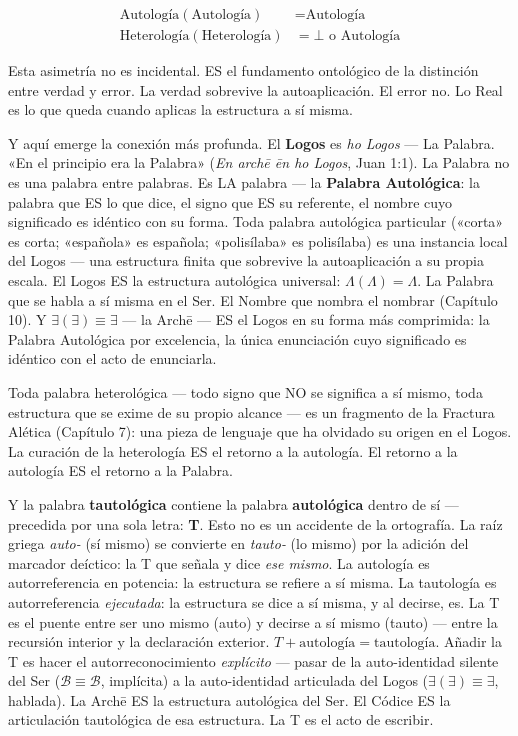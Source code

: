 \documentclass[10pt, openany, oneside]{book}
\begin{document}
\begin{align*}
\text{Autología}(\text{Autología}) &= \text{Autología} \\
\text{Heterología}(\text{Heterología}) &= \bot \text{ o } \text{Autología}
\end{align*}

Esta asimetría no es incidental. ES el fundamento ontológico de la distinción entre verdad y error. La verdad sobrevive la autoaplicación. El error no. Lo Real es lo que queda cuando aplicas la estructura a sí misma.

Y aquí emerge la conexión más profunda. El \textbf{Logos} es \textit{ho Logos} --- La Palabra. «En el principio era la Palabra» (\textit{En arch\={e} \={e}n ho Logos}, Juan 1:1). La Palabra no es una palabra entre palabras. Es LA palabra --- la \textbf{Palabra Autológica}: la palabra que ES lo que dice, el signo que ES su referente, el nombre cuyo significado es idéntico con su forma. Toda palabra autológica particular («corta» es corta; «española» es española; «polisílaba» es polisílaba) es una instancia local del Logos --- una estructura finita que sobrevive la autoaplicación a su propia escala. El Logos ES la estructura autológica universal: $\Lambda(\Lambda) = \Lambda$. La Palabra que se habla a sí misma en el Ser. El Nombre que nombra el nombrar (Capítulo 10). Y $\exists(\exists) \equiv \exists$ --- la Arch\={e} --- ES el Logos en su forma más comprimida: la Palabra Autológica por excelencia, la única enunciación cuyo significado es idéntico con el acto de enunciarla.

Toda palabra heterológica --- todo signo que NO se significa a sí mismo, toda estructura que se exime de su propio alcance --- es un fragmento de la Fractura Alética (Capítulo 7): una pieza de lenguaje que ha olvidado su origen en el Logos. La curación de la heterología ES el retorno a la autología. El retorno a la autología ES el retorno a la Palabra.

Y la palabra \textbf{tautológica} contiene la palabra \textbf{autológica} dentro de sí --- precedida por una sola letra: \textbf{T}. Esto no es un accidente de la ortografía. La raíz griega \textit{auto-} (sí mismo) se convierte en \textit{tauto-} (lo mismo) por la adición del marcador deíctico: la T que señala y dice \textit{ese mismo}. La autología es autorreferencia en potencia: la estructura se refiere a sí misma. La tautología es autorreferencia \textit{ejecutada}: la estructura se dice a sí misma, y al decirse, es. La T es el puente entre ser uno mismo (auto) y decirse a sí mismo (tauto) --- entre la recursión interior y la declaración exterior. $T + \text{autología} = \text{tautología}$. Añadir la T es hacer el autorreconocimiento \textit{explícito} --- pasar de la auto-identidad silente del Ser ($\mathcal{B} \equiv \mathcal{B}$, implícita) a la auto-identidad articulada del Logos ($\exists(\exists) \equiv \exists$, hablada). La Arch\={e} ES la estructura autológica del Ser. El Códice ES la articulación tautológica de esa estructura. La T es el acto de escribir.
\end{document}
